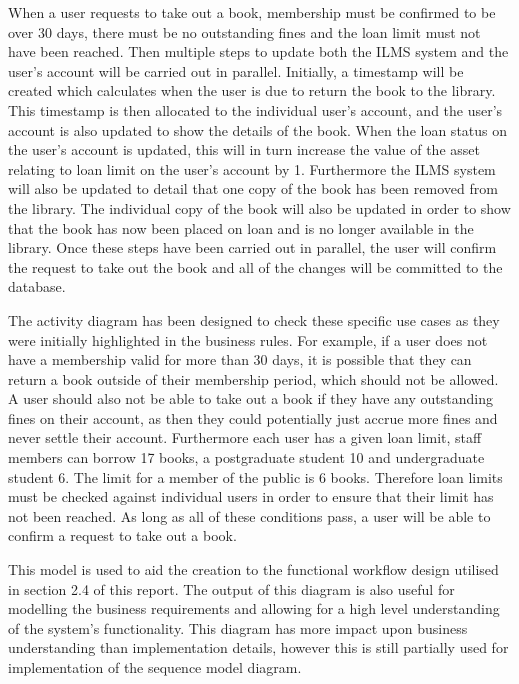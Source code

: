 When a user requests to take out a book, membership must be confirmed to be over 30 days, there must be no outstanding fines and the loan limit must not have been reached. Then multiple steps to update both the ILMS system and the user’s account will be carried out in parallel. Initially, a timestamp will be created which calculates when the user is due to return the book to the library. This timestamp is then allocated to the individual user’s account, and the user’s account is also updated to show the details of the book. When the loan status on the user’s account is updated, this will in turn increase the value of the asset relating to loan limit on the user’s account by 1. Furthermore the ILMS system will also be updated to detail that one copy of the book has been removed from the library. The individual copy of the book will also be updated in order to show that the book has now been placed on loan and is no longer available in the library. Once these steps have been carried out in parallel, the user will confirm the request to take out the book and all of the changes will be committed to the database.

The activity diagram has been designed to check these specific use cases as they were initially highlighted in the business rules. For example, if a user does not have a membership valid for more than 30 days, it is possible that they can return a book outside of their membership period, which should not be allowed. A user should also not be able to take out a book if they have any outstanding fines on their account, as then they could potentially just accrue more fines and never settle their account. Furthermore each user has a given loan limit, staff members can borrow 17 books, a postgraduate student 10 and undergraduate student 6. The limit for a member of the public is 6 books. Therefore loan limits must be checked against individual users in order to ensure that their limit has not been reached. As long as all of these conditions pass, a user will be able to confirm a request to take out a book. 

This model is used to aid the creation to the functional workflow design utilised in section 2.4 of this report. The output of this diagram is also useful for modelling the business requirements and allowing for a high level understanding of the system's functionality\cite{sourcemakingactivity}. This diagram has more impact upon business understanding than implementation details, however this is still partially used for implementation of the sequence model diagram. 